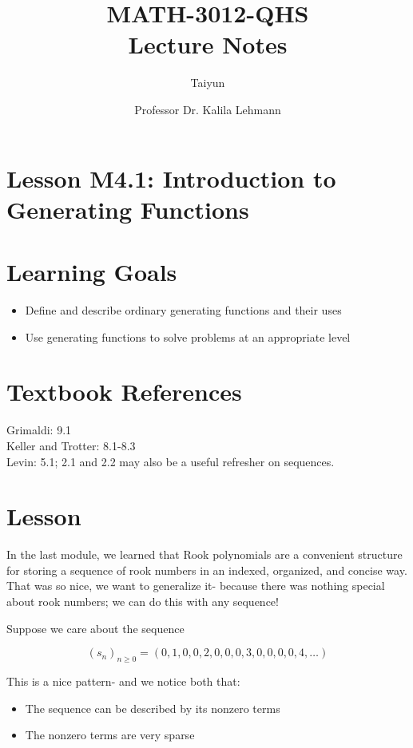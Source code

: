 \documentclass{article}
\author{Taiyun}
\title{MATH-3012-QHS \\ Lecture Notes}
\date{Professor Dr. Kalila Lehmann}
\theoremstyle{definition}
\begin{document}
\maketitle







\section*{Lesson M4.1: Introduction to Generating Functions}
\section*{Learning Goals}
\begin{itemize}
  \item Define and describe ordinary generating functions and their uses
  \item Use generating functions to solve problems at an appropriate level
\end{itemize}

\section*{Textbook References}
Grimaldi: 9.1\\
Keller and Trotter: 8.1-8.3\\
Levin: 5.1; 2.1 and 2.2 may also be a useful refresher on sequences.

\section*{Lesson}
In the last module, we learned that Rook polynomials are a convenient structure for storing a sequence of rook numbers in an indexed, organized, and concise way. That was so nice, we want to generalize it- because there was nothing special about rook numbers; we can do this with any sequence!

Suppose we care about the sequence

$$
\left(s_{n}\right)_{n \geq 0}=(0,1,0,0,2,0,0,0,3,0,0,0,0,4, \ldots)
$$

This is a nice pattern- and we notice both that:

\begin{itemize}
  \item The sequence can be described by its nonzero terms
  \item The nonzero terms are very sparse
\end{itemize}
\end{document}
